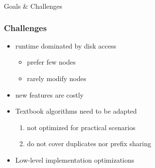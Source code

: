 \documentclass{beamer}
\begin{document}
\begin{section}{Goals \& Challenges}
    \begin{frame}
      \frametitle{Challenges}
        \begin{itemize}
          \item runtime dominated by disk access
          \begin{itemize}
            \item prefer few nodes
            \item rarely modify nodes
          \end{itemize}
          \item new features are costly
          \item Textbook algorithms need to be adapted
          \begin{enumerate}
            \item not optimized for practical scenarios
            \item do not cover duplicates nor prefix sharing
          \end{enumerate}
          \item Low-level implementation optimizations
        \end{itemize}
    \end{frame}
  \end{section}
\end{document}
